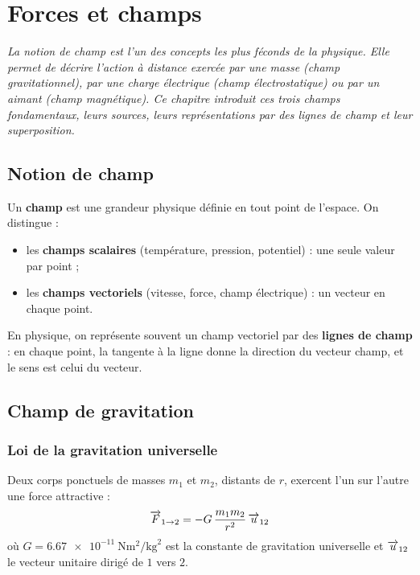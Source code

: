 \chapter{Forces et champs}

\textit{La notion de champ est l’un des concepts les plus féconds de la physique. Elle permet de décrire l’action à distance exercée par une masse (champ gravitationnel), par une charge électrique (champ électrostatique) ou par un aimant (champ magnétique). Ce chapitre introduit ces trois champs fondamentaux, leurs sources, leurs représentations par des lignes de champ et leur superposition.}

\section{Notion de champ}

\begin{definition}[Champ]
Un \textbf{champ} est une grandeur physique définie en tout point de l’espace. On distingue :
\begin{itemize}
\item les \textbf{champs scalaires} (température, pression, potentiel) : une seule valeur par point ;
\item les \textbf{champs vectoriels} (vitesse, force, champ électrique) : un vecteur en chaque point.
\end{itemize}
\end{definition}

\begin{remarque}
En physique, on représente souvent un champ vectoriel par des \textbf{lignes de champ} : en chaque point, la tangente à la ligne donne la direction du vecteur champ, et le sens est celui du vecteur.
\end{remarque}

\section{Champ de gravitation}

\subsection{Loi de la gravitation universelle}

\begin{loi}
Deux corps ponctuels de masses $m_1$ et $m_2$, distants de $r$, exercent l’un sur l’autre une force attractive :
\[
\overrightarrow{F}_{1\to2} = -G\,\frac{m_1 m_2}{r^2}\,\overrightarrow{u}_{12}
\]
où $G = \SI{6.67e-11}{\newton\metre\squared\per\kilogram\squared}$ est la constante de gravitation universelle et $\overrightarrow{u}_{12}$ le vecteur unitaire dirigé de $1$ vers $2$.
\end{loi}

